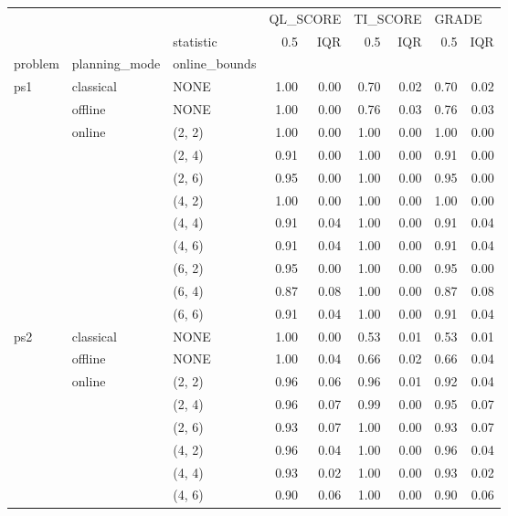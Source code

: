 \begin{tabular}{lllrrrrrr}
\toprule
    &        & {} & \multicolumn{2}{l}{QL\_SCORE} & \multicolumn{2}{l}{TI\_SCORE} & \multicolumn{2}{l}{GRADE} \\
    &        & statistic &      0.5 &  IQR &      0.5 &  IQR &   0.5 &  IQR \\
problem & planning\_mode & online\_bounds &          &      &          &      &       &      \\
\midrule
ps1 & classical & NONE &     1.00 & 0.00 &     0.70 & 0.02 &  0.70 & 0.02 \\
    & offline & NONE &     1.00 & 0.00 &     0.76 & 0.03 &  0.76 & 0.03 \\
    & online & (2, 2) &     1.00 & 0.00 &     1.00 & 0.00 &  1.00 & 0.00 \\
    &        & (2, 4) &     0.91 & 0.00 &     1.00 & 0.00 &  0.91 & 0.00 \\
    &        & (2, 6) &     0.95 & 0.00 &     1.00 & 0.00 &  0.95 & 0.00 \\
    &        & (4, 2) &     1.00 & 0.00 &     1.00 & 0.00 &  1.00 & 0.00 \\
    &        & (4, 4) &     0.91 & 0.04 &     1.00 & 0.00 &  0.91 & 0.04 \\
    &        & (4, 6) &     0.91 & 0.04 &     1.00 & 0.00 &  0.91 & 0.04 \\
    &        & (6, 2) &     0.95 & 0.00 &     1.00 & 0.00 &  0.95 & 0.00 \\
    &        & (6, 4) &     0.87 & 0.08 &     1.00 & 0.00 &  0.87 & 0.08 \\
    &        & (6, 6) &     0.91 & 0.04 &     1.00 & 0.00 &  0.91 & 0.04 \\
ps2 & classical & NONE &     1.00 & 0.00 &     0.53 & 0.01 &  0.53 & 0.01 \\
    & offline & NONE &     1.00 & 0.04 &     0.66 & 0.02 &  0.66 & 0.04 \\
    & online & (2, 2) &     0.96 & 0.06 &     0.96 & 0.01 &  0.92 & 0.04 \\
    &        & (2, 4) &     0.96 & 0.07 &     0.99 & 0.00 &  0.95 & 0.07 \\
    &        & (2, 6) &     0.93 & 0.07 &     1.00 & 0.00 &  0.93 & 0.07 \\
    &        & (4, 2) &     0.96 & 0.04 &     1.00 & 0.00 &  0.96 & 0.04 \\
    &        & (4, 4) &     0.93 & 0.02 &     1.00 & 0.00 &  0.93 & 0.02 \\
    &        & (4, 6) &     0.90 & 0.06 &     1.00 & 0.00 &  0.90 & 0.06 \\

\end{tabular}
